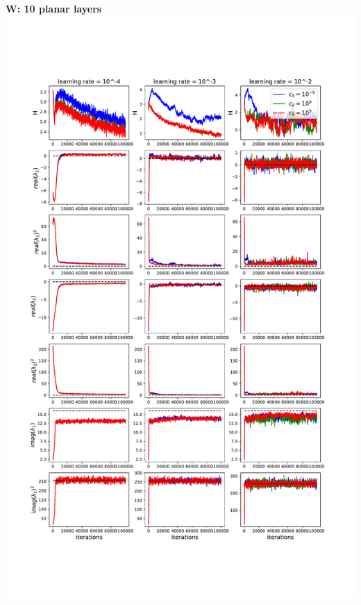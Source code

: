\documentclass[11pt]{article}
\begin{document}
\clearpage
\begin{center}
\textbf{W: 10 planar layers} \\
\includegraphics[scale=.45]{images/learnW_10P.pdf} \\
\end{center}
\end{document}
